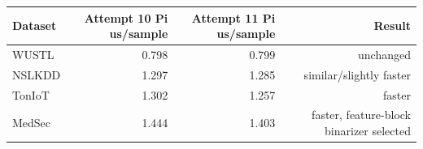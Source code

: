 \begin{tabular}{lrrr}
\toprule
Dataset & Attempt 10 Pi us/sample & Attempt 11 Pi us/sample & Result \\
\midrule
WUSTL & 0.798 & 0.799 & unchanged \\
NSLKDD & 1.297 & 1.285 & similar/slightly faster \\
TonIoT & 1.302 & 1.257 & faster \\
MedSec & 1.444 & 1.403 & faster, feature-block binarizer selected \\
\bottomrule
\end{tabular}
